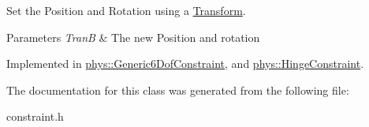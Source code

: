 Set the Position and Rotation using a \hyperlink{classphys_1_1Transform}{Transform}. 


\begin{DoxyParams}{Parameters}
{\em TranB} & The new Position and rotation \\
\hline
\end{DoxyParams}


Implemented in \hyperlink{classphys_1_1Generic6DofConstraint_a5216ec1b5d67dd12971d58c5aa03a52f}{phys::Generic6DofConstraint}, and \hyperlink{classphys_1_1HingeConstraint_a79ef3dc47fa94a7a9f98f7934e786a6b}{phys::HingeConstraint}.



The documentation for this class was generated from the following file:\begin{DoxyCompactItemize}
\item 
constraint.h\end{DoxyCompactItemize}
